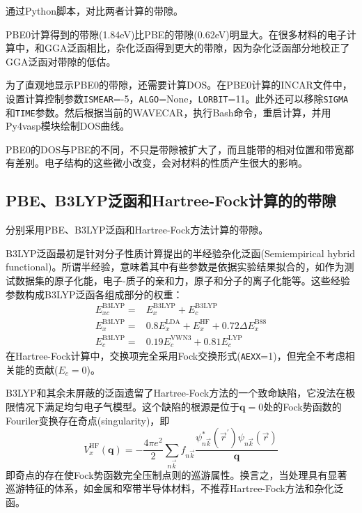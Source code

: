 通过\textrm{Python}脚本，对比两者计算的带隙。

\textrm{PBE0}计算得到的带隙(\textrm{1.84eV})比\textrm{PBE}的带隙(\textrm{0.62eV})明显大。在很多材料的电子计算中，和\textrm{GGA}泛函相比，杂化泛函得到更大的带隙，因为杂化泛函部分地校正了\textrm{GGA}泛函对带隙的低估。

为了直观地显示\textrm{PBE0}的带隙，还需要计算\textrm{DOS}。在\textrm{PBE0}计算的\textrm{INCAR}文件中，设置计算控制参数\texttt{ISMEAR}=-5，\texttt{ALGO}=\textrm{None}，\texttt{LORBIT}=11。此外还可以移除\texttt{SIGMA}和\texttt{TIME}参数。然后根据当前的\textrm{WAVECAR}，执行\textrm{Bash}命令，重启计算，并用\textrm{Py4vasp}模块绘制\textrm{DOS}曲线。

\textrm{PBE0}的\textrm{DOS}与\textrm{PBE}的不同，不只是带隙被扩大了，而且能带的相对位置和带宽都有差别。电子结构的这些微小改变，会对材料的性质产生很大的影响。

\subsection{\rm{PBE}、\rm{B3LYP}泛函和\rm{Hartree-Fock}计算的的带隙}
分别采用\textrm{PBE}、\textrm{B3LYP}泛函和\textrm{Hartree-Fock}方法计算的带隙。

\textrm{B3LYP}泛函最初是针对分子性质计算提出的半经验杂化泛函\textrm{(Semiempirical hybrid functional)}。所谓半经验，意味着其中有些参数是依据实验结果拟合的，如作为测试数据集的原子化能，电子-质子的亲和力，原子和分子的离子化能等。这些经验参数构成\textrm{B3LYP}泛函各组成部分的权重：
\begin{displaymath}
	\begin{aligned}
		E_{xc}^{\mathrm{B3LYP}}=&E_{x}^{\mathrm{B3LYP}}+E_{c}^{\mathrm{B3LYP}}\\
		E_{x}^{\mathrm{B3LYP}}=&0.8E_{x}^{\mathrm{LDA}}+E_{x}^{\mathrm{HF}}+0.72\Delta E_x^{\mathrm{B88}}\\
		E_{c}^{\mathrm{B3LYP}}=&0.19E_{c}^{\mathrm{VWN3}}+0.81E_{c}^{\mathrm{LYP}}
	\end{aligned}
\end{displaymath}
在\textrm{Hartree-Fock}计算中，交换项完全采用\textrm{Fock}交换形式(\texttt{AEXX}=1)，但完全不考虑相关能的贡献($E_c=0$)。

\textrm{B3LYP}和其余未屏蔽的泛函遗留了\textrm{Hartree-Fock}方法的一个致命缺陷，它没法在极限情况下满足均匀电子气模型。这个缺陷的根源是位于$\mathbf{q}=0$处的\textrm{Fock}势函数的\textrm{Fouriler}变换存在奇点\textrm{(singularity)}，即
\begin{displaymath}
	V_x^{\mathrm{HF}}(\mathbf{q})=-\dfrac{4\pi e^2}2\sum_{n\vec k}f_{n\vec k}\dfrac{\psi_{n\vec k}^{\ast}(\vec r^{\prime})\psi_{n\vec k}(\vec r)}{\mathbf{q}}
\end{displaymath}
即奇点的存在使\textrm{Fock}势函数完全压制点则的巡游属性。换言之，当处理具有显著巡游特征的体系，如金属和窄带半导体材料，不推荐\textrm{Hartree-Fock}方法和杂化泛函。

